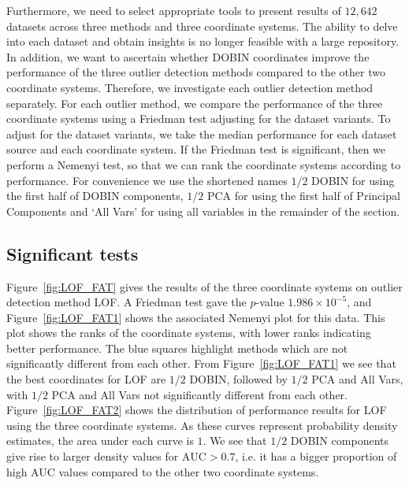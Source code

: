 \documentclass[a4paper,11pt]{article}
\begin{document}
Furthermore, we need to select appropriate tools to present results of $12,642$ datasets across three methods and three coordinate systems. The ability to delve into each dataset and obtain  insights is no longer feasible with a large repository.  In addition, we want to ascertain whether DOBIN coordinates improve the performance of the three outlier detection methods compared to the other two coordinate systems. Therefore, we investigate each outlier detection method separately. For each outlier method, we compare the performance of the three coordinate systems using a Friedman test adjusting for the dataset variants. To adjust for the dataset variants, we take the median performance for each dataset source and each coordinate system.  If the Friedman test is significant, then we perform a Nemenyi test, so that we can rank the  coordinate systems according to performance. For convenience we use the shortened names $1/2$ DOBIN for using the first half of DOBIN components, $1/2$ PCA for using the first half of Principal Components and `All Vars' for using all variables in the remainder of the section.   

\subsection{Significant tests}\label{sec:DatRepo1}

Figure~\ref{fig:LOF_FAT} gives the results of the three coordinate systems on  outlier detection method LOF. A Friedman test gave the $p$-value $1.986 \times 10^{-5}$, and Figure~\ref{fig:LOF_FAT1} shows the associated Nemenyi plot for this data. This plot shows the ranks of the coordinate systems, with lower ranks indicating better performance. The blue squares highlight methods which are not significantly different from each other. From Figure~\ref{fig:LOF_FAT1} we see that the best coordinates for LOF are $1/2$ DOBIN, followed by $1/2$ PCA and All Vars, with $1/2$ PCA and  All Vars not significantly different from each other. 
Figure~\ref{fig:LOF_FAT2} shows the distribution of performance results for LOF using the three coordinate systems. As these curves represent probability density estimates, the area under each curve is $1$. We see that $1/2$ DOBIN components give rise to larger density values for $\text{AUC} > 0.7$, i.e. it has a bigger proportion of high AUC values compared to the other two coordinate systems. \\   
\end{document}
